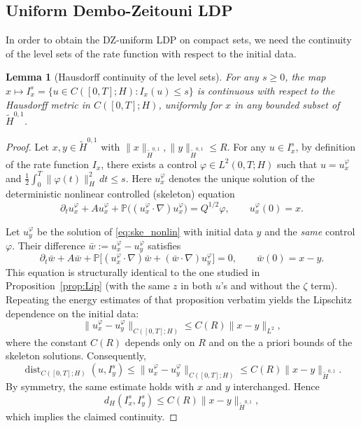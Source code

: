 \documentclass[11pt,a4paper,reqno]{amsart}
\newtheorem{lemma}[theorem]{Lemma}
\theoremstyle{definition}
\begin{document}
\subsection{Uniform Dembo-Zeitouni LDP}
\label{sec:DZ}

In order to obtain the DZ-uniform LDP on compact sets, we need the continuity
of the level sets of the rate function with respect to the initial data.

\begin{lemma}[Hausdorff continuity of the level sets]\label{lem:levelset}
  For any $s\ge 0$, the map $x\mapsto I_x^s = \{u\in C([0,T];H) : I_x(u)\le s\}$
  is continuous with respect to the Hausdorff metric in $C([0,T];H)$, uniformly
  for $x$ in any bounded subset of $\widetilde H^{0,1}$.
\end{lemma}

\begin{proof}
  Let $x,y\in\widetilde H^{0,1}$ with $\|x\|_{\widetilde H^{0,1}},\|y\|_{\widetilde H^{0,1}}\le R$.
  For any $u\in I_x^s$, by definition of the rate function $I_x$, there exists a
  control $\varphi\in L^2(0,T;H)$ such that $u = u_x^\varphi$ and
  $\frac12\int_0^T\|\varphi(t)\|_H^2\,dt \le s$. Here $u_x^\varphi$ denotes the
  unique solution of the deterministic nonlinear controlled (skeleton) equation
  \begin{equation}\label{eq:ske_nonlin}
    \partial_t u_x^\varphi + A u_x^\varphi + \mathbb P\bigl((u_x^\varphi\cdot\nabla)u_x^\varphi\bigr)
    = Q^{1/2}\varphi,\qquad u_x^\varphi(0)=x .
  \end{equation}

  Let $u_y^\varphi$ be the solution of \eqref{eq:ske_nonlin} with initial data $y$
  and the \emph{same} control $\varphi$. Their difference
  $\bar w := u_x^\varphi - u_y^\varphi$ satisfies
  \[
    \partial_t \bar w + A \bar w + \mathbb P\bigl[(u_x^\varphi\cdot\nabla)\bar w
    + (\bar w\cdot\nabla)u_y^\varphi\bigr] = 0,\qquad \bar w(0)=x-y .
  \]
  This equation is structurally identical to the one studied in
  Proposition~\ref{prop:Lip} (with the same $z$ in both $u$'s and without the
  $\zeta$ term). Repeating the energy estimates of that proposition verbatim
  yields the Lipschitz dependence on the initial data:
  \[
    \|u_x^\varphi - u_y^\varphi\|_{C([0,T];H)} \le C(R) \|x-y\|_{L^2},
  \]
  where the constant $C(R)$ depends only on $R$ and on the a priori bounds of
  the skeleton solutions.
  Consequently,
  \[
    \operatorname{dist}_{C([0,T];H)}(u, I_y^s)
    \le \|u_x^\varphi - u_y^\varphi\|_{C([0,T];H)}
    \le C(R) \|x-y\|_{\widetilde H^{0,1}} .
  \]
  By symmetry, the same estimate holds with $x$ and $y$ interchanged. Hence
  \[
    d_H(I_x^s, I_y^s) \le C(R) \|x-y\|_{\widetilde H^{0,1}},
  \]
  which implies the claimed continuity.
\end{proof}
\end{document}
